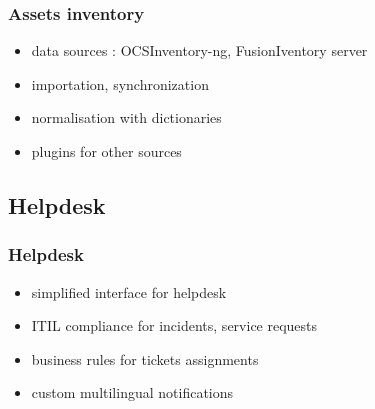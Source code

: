 \documentclass{beamer}
\begin{document}
\begin{frame}
\frametitle{Assets inventory}

\begin{itemize}
%
\item data sources : OCSInventory-ng, FusionIventory server
\item importation, synchronization
\item normalisation with dictionaries
\item plugins for other sources
%
\end{itemize}
\end{frame}
\subsection{Helpdesk}
\begin{frame}
\frametitle{Helpdesk}
%
\begin{itemize}
%
\item simplified interface for helpdesk
\item ITIL compliance for incidents, service requests
\item business rules for tickets assignments
\item custom multilingual notifications
%
\end{itemize}
\end{frame}
\end{document}
